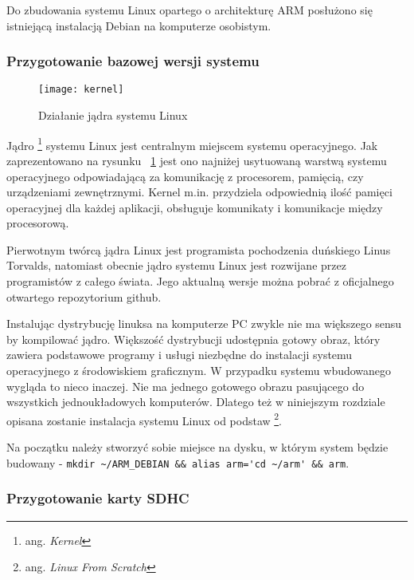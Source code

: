 Do zbudowania systemu Linux opartego o architekturę ARM posłużono się istniejącą instalacją Debian na komputerze osobistym. 

\subsubsection{Przygotowanie bazowej wersji systemu}

\begin{figure}
\begin{center}
    \texttt{[image: kernel]}
\end{center}
\caption{Działanie jądra systemu Linux}
\label{fig:kernel}
\end{figure}

Jądro \footnote{ang. \emph{Kernel}} systemu Linux jest centralnym miejscem systemu operacyjnego. Jak zaprezentowano na rysunku ~\ref{fig:kernel} jest ono najniżej usytuowaną warstwą systemu operacyjnego odpowiadającą za komunikację z procesorem, pamięcią, czy urządzeniami zewnętrznymi. Kernel m.in. przydziela odpowiednią ilość pamięci operacyjnej dla każdej aplikacji, obsługuje komunikaty i komunikacje między procesorową.

Pierwotnym twórcą jądra Linux jest programista pochodzenia duńskiego Linus Torvalds, natomiast obecnie jądro systemu Linux jest rozwijane przez programistów z całego świata. Jego aktualną wersje można pobrać z oficjalnego otwartego repozytorium github.


\par


Instalując dystrybucję linuksa na komputerze PC zwykle nie ma większego sensu by kompilować jądro. Większość dystrybucji udostępnia gotowy obraz, który zawiera podstawowe programy i usługi niezbędne do instalacji systemu operacyjnego z środowiskiem graficznym. W przypadku systemu wbudowanego wygląda to nieco inaczej. Nie ma jednego gotowego obrazu pasującego do wszystkich jednoukładowych komputerów. Dlatego też w niniejszym rozdziale opisana zostanie instalacja systemu Linux od podstaw \footnote{ang. \emph{Linux From Scratch}}.

\par


Na początku należy stworzyć sobie miejsce na dysku, w którym system będzie budowany - \lstinline|mkdir ~/ARM_DEBIAN && alias arm='cd ~/arm' && arm|.

\subsubsection{Przygotowanie karty SDHC}



